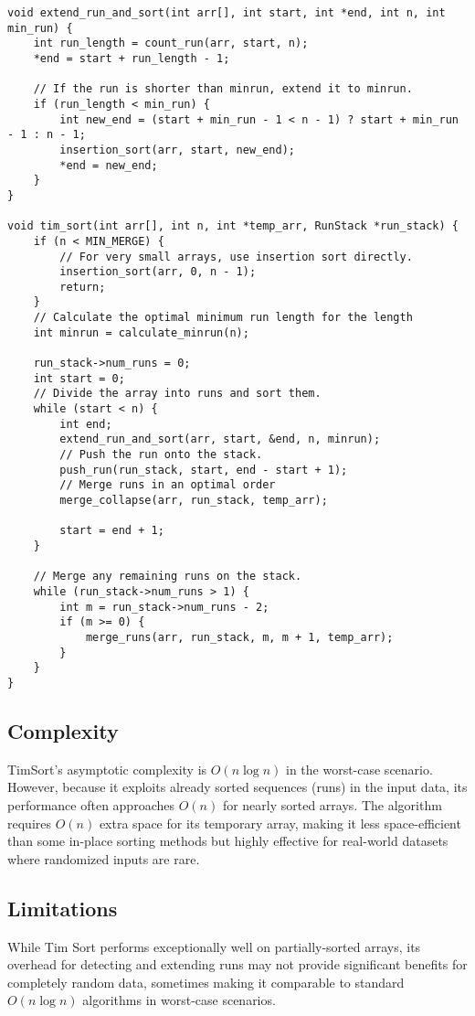 \begin{multicols}{2}
\begin{verbatim}
void extend_run_and_sort(int arr[], int start, int *end, int n, int min_run) {
    int run_length = count_run(arr, start, n);
    *end = start + run_length - 1;

    // If the run is shorter than minrun, extend it to minrun.
    if (run_length < min_run) {
        int new_end = (start + min_run - 1 < n - 1) ? start + min_run - 1 : n - 1;
        insertion_sort(arr, start, new_end);
        *end = new_end;
    }
}

void tim_sort(int arr[], int n, int *temp_arr, RunStack *run_stack) {
    if (n < MIN_MERGE) {
        // For very small arrays, use insertion sort directly.
        insertion_sort(arr, 0, n - 1);
        return;
    }
    // Calculate the optimal minimum run length for the length
    int minrun = calculate_minrun(n);

    run_stack->num_runs = 0;
    int start = 0;
    // Divide the array into runs and sort them.
    while (start < n) {
        int end;
        extend_run_and_sort(arr, start, &end, n, minrun);
        // Push the run onto the stack.
        push_run(run_stack, start, end - start + 1);
        // Merge runs in an optimal order
        merge_collapse(arr, run_stack, temp_arr);

        start = end + 1;
    }

    // Merge any remaining runs on the stack.
    while (run_stack->num_runs > 1) {
        int m = run_stack->num_runs - 2;
        if (m >= 0) {
            merge_runs(arr, run_stack, m, m + 1, temp_arr);
        }
    }
}
\end{verbatim}

\subsection{Complexity}

TimSort's asymptotic complexity is $O(n\log{n})$ in the worst-case scenario. However, because it exploits already sorted sequences (runs) in the input data, its performance often approaches $O(n)$ for nearly sorted arrays. The algorithm requires $O(n)$ extra space for its temporary array, making it less space-efficient than some in-place sorting methods but highly effective for real-world datasets where randomized inputs are rare.

\subsection{Limitations}

While Tim Sort performs exceptionally well on partially-sorted arrays, its overhead for detecting and extending runs may not provide significant benefits for completely random data, sometimes making it comparable to standard $O(n\log{n})$ algorithms in worst-case scenarios.

\end{multicols}